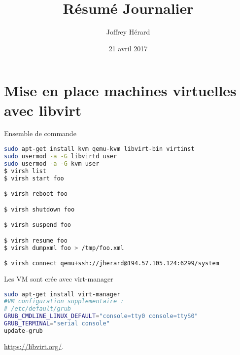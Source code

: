 \documentclass[french]{article}
\begin{document}
\title{Résumé Journalier}
\author{Joffrey Hérard}
\date{21 avril 2017} 

\maketitle
\section{Mise en place machines virtuelles avec libvirt}

Ensemble de commande 
\begin{lstlisting}[language=bash,caption={}]
sudo apt-get install kvm qemu-kvm libvirt-bin virtinst
sudo usermod -a -G libvirtd user
sudo usermod -a -G kvm user
$ virsh list
$ virsh start foo

$ virsh reboot foo

$ virsh shutdown foo

$ virsh suspend foo

$ virsh resume foo
$ virsh dumpxml foo > /tmp/foo.xml

$ virsh connect qemu+ssh://jherard@194.57.105.124:6299/system
\end{lstlisting}
Les VM sont crée avec virt-manager
\begin{lstlisting}[language=bash,caption={}]
sudo apt-get install virt-manager
#VM configuration supplementaire : 
# /etc/default/grub
GRUB_CMDLINE_LINUX_DEFAULT="console=tty0 console=ttyS0"
GRUB_TERMINAL="serial console"
update-grub

\end{lstlisting}

\newpage
\begin{thebibliography}{9}

       
          \url{https://libvirt.org/}.

\end{thebibliography}
\end{document}
